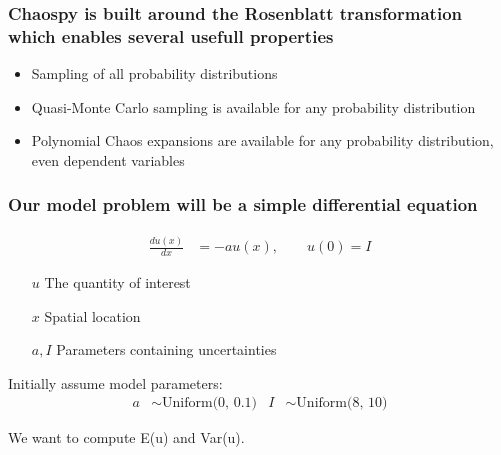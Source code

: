 \documentclass[handout]{beamer}
\begin{document}
 \begin{frame}
 \frametitle{Chaospy is built around the Rosenblatt transformation which enables several usefull properties}

\begin{itemize}[<+->]
\item Sampling of all probability distributions
\vspace{3mm}
\item Quasi-Monte Carlo sampling is available for any probability distribution
\vspace{3mm}
\item Polynomial Chaos expansions are available for any probability distribution, even dependent variables
\end{itemize}

 \end{frame}




\begin{frame}
 \frametitle{Our model problem will be a simple differential equation}
 \vspace{-10mm}
  \begin{align*}
    \frac{d u(x)}{dx} & =-au(x),\qquad u(0) = I
  \end{align*}
  \vspace{-5 mm}
  \begin{itemize}
    \item[$u$] The quantity of interest
    \item[$x$] Spatial location
    \item[$a,I$] Parameters containing uncertainties
  \end{itemize}
\vspace{8 mm}
 \pause
Initially assume model parameters:
\begin{align*}
a &\sim \text{Uniform(0, 0.1)} & I& \sim \text{Uniform(8, 10)}
\end{align*}

\pause
\vspace{5mm}
We want to compute E(u) and Var(u).

\end{frame}
\end{document}
